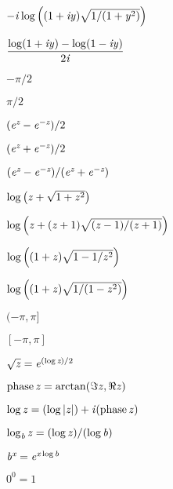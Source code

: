 {\newpage
\clearpage
\samepage \( -{\it i}\log \left((1+{\it i}{\it y}) \sqrt{1/(1+{\it y}^2)}\right) \)
}

{\newpage
\clearpage
\samepage \( \displaystyle { \log (1+{\it i}{\it y}) - \log (1-{\it i}{\it y}) \over 2{\it i} } \)
}

{\newpage
\clearpage
\samepage $-\pi/2$
}

{\newpage
\clearpage
\samepage $\pi/2$
}

{\newpage
\clearpage
\samepage \( ({\it e}^{\hbox{\scriptsize\it z}}-{\it e}^{-\hbox{\scriptsize\it z}})/2 \)
}

{\newpage
\clearpage
\samepage \( ({\it e}^{\hbox{\scriptsize\it z}}+{\it e}^{-\hbox{\scriptsize\it z}})/2 \)
}

{\newpage
\clearpage
\samepage \( ({\it e}^{\hbox{\scriptsize\it z}}-{\it e}^{-\hbox{\scriptsize\it z}})/({\it e}^{\hbox{\scriptsize\it z}}+{\it e}^{-\hbox{\scriptsize\it z}}) \)
}

{\newpage
\clearpage
\samepage \( \log \left({\it z}+\sqrt{1+{\it z}^2}\right) \)
}

{\newpage
\clearpage
\samepage \( \log \left({\it z}+({\it z}+1)\sqrt{({\it z}-1)/({\it z}+1)}\right) \)
}

{\newpage
\clearpage
\samepage \( \log \left((1+{\it z})\sqrt{1-1/{\it z}^2}\right) \)
}

{\newpage
\clearpage
\samepage \( \log \left((1+{\it z})\sqrt{1/(1-{\it z}^2)}\right) \)
}

{\newpage
\clearpage
\samepage $(-\pi,\pi]$
}

{\newpage
\clearpage
\samepage $[-\pi,\pi]$
}

{\newpage
\clearpage
\samepage \( \sqrt{{\it z}} = {\it e}^{(\log \hbox{\scriptsize\it z})/2} \)
}

{\newpage
\clearpage
\samepage \( \mathop{\rm phase}\nolimits {\it z} = \arctan (\Im {\it z}, \Re {\it z}) \)
}

{\newpage
\clearpage
\samepage \( \log {\it z} = \left(\log \left|{\it z}\right|\right)+{\it i} (\mathop{\rm phase}\nolimits {\it z}) \)
}

{\newpage
\clearpage
\samepage \( \log_{\hbox{\scriptsize\it b}} {\it z}=(\log {\it z})/(\log {\it b}) \)
}

{\newpage
\clearpage
\samepage \( {\it b}^{\hbox{\scriptsize\it x}}={\it e}^{\hbox{\scriptsize\it x} \log \hbox{\scriptsize\it b} } \)
}

{\newpage
\clearpage
\samepage $0^0=1$
}

